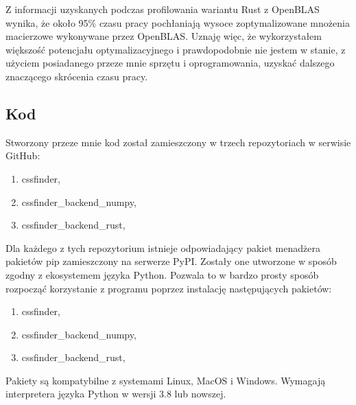 \documentclass[11pt, a4paper]{article}
\begin{document}
\begin{sloppypar}
    Z informacji uzyskanych podczas profilowania wariantu Rust z OpenBLAS wynika, że około
    95\% czasu pracy pochłaniają wysoce zoptymalizowane mnożenia macierzowe wykonywane
    przez OpenBLAS. Uznaję więc, że wykorzystałem większość potencjału optymalizacyjnego
    i prawdopodobnie nie jestem w stanie, z użyciem posiadanego przeze mnie sprzętu i oprogramowania,
    uzyskać dalszego znaczącego skrócenia czasu pracy.

    \subsection{Kod}
    Stworzony przeze mnie kod został zamieszczony w trzech repozytoriach w serwisie
    GitHub:
    \begin{enumerate}
      \item cssfinder\cite{CSSFinder_New},

      \item cssfinder\_backend\_numpy\cite{CSSFinder_New_Numpy},

      \item cssfinder\_backend\_rust\cite{CSSFinder_New_Rust},
    \end{enumerate}

    Dla każdego z tych repozytorium istnieje odpowiadający pakiet menadżera pakietów pip
    zamieszczony na serwerze PyPI. Zostały one utworzone w sposób zgodny z ekosystemem języka
    Python. Pozwala to w bardzo prosty sposób rozpocząć korzystanie z programu poprzez
    instalację następujących pakietów:
    \begin{enumerate}
      \item cssfinder\cite{CSSFinder_New_PyPI},

      \item cssfinder\_backend\_numpy\cite{CSSFinder_New_Numpy_PyPI},

      \item cssfinder\_backend\_rust\cite{CSSFinder_New_Rust_PyPI},
    \end{enumerate}

    Pakiety są kompatybilne z systemami Linux, MacOS i Windows. Wymagają interpretera
    języka Python w wersji 3.8 lub nowszej.
  \end{sloppypar}
  \newpage
  \begin{sloppypar}
    \medskip


    \printbibliography
    [heading=bibintoc, title={Odwołania}]
  \end{sloppypar}
\end{document}
